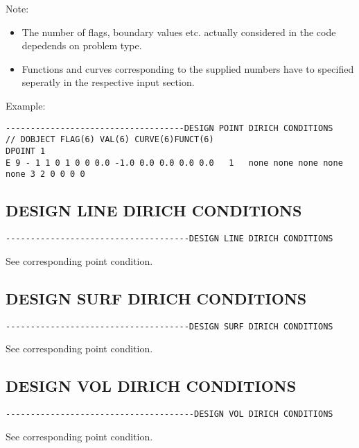 Note:
\begin{itemize}
\item The number of flags, boundary values etc. actually considered in the code depedends on problem type.
\item Functions and curves corresponding to the supplied numbers have to specified seperatly in the 
respective input  section.
\end{itemize}

Example:

\begin{verbatim}
------------------------------------DESIGN POINT DIRICH CONDITIONS 
// DOBJECT FLAG(6) VAL(6) CURVE(6)FUNCT(6)
DPOINT 1
E 9 - 1 1 0 1 0 0 0.0 -1.0 0.0 0.0 0.0 0.0   1   none none none none none 3 2 0 0 0 0
\end{verbatim}


\subsection{DESIGN LINE DIRICH CONDITIONS}
\begin{verbatim}
-------------------------------------DESIGN LINE DIRICH CONDITIONS
\end{verbatim}

See corresponding point condition.

\subsection{DESIGN SURF DIRICH CONDITIONS}
\begin{verbatim}
-------------------------------------DESIGN SURF DIRICH CONDITIONS
\end{verbatim}
See corresponding point condition.


\subsection{DESIGN VOL DIRICH CONDITIONS}
\begin{verbatim}
--------------------------------------DESIGN VOL DIRICH CONDITIONS
\end{verbatim}
See corresponding point condition.

